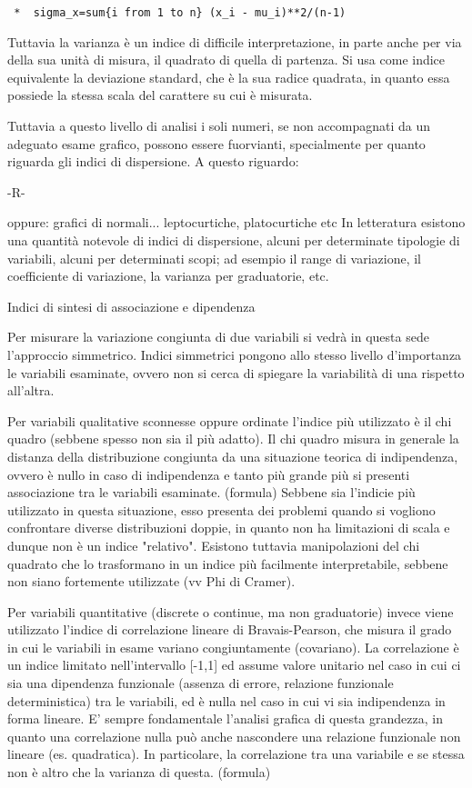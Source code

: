 \documentclass{book}
\begin{document}
\begin{verbatim}
 *	sigma_x=sum{i from 1 to n} (x_i - mu_i)**2/(n-1)
\end{verbatim}

Tuttavia la varianza \`{e} un indice di difficile interpretazione, in parte anche per via della sua unit\`{a} di misura, il quadrato di quella di partenza. Si usa come indice equivalente la deviazione standard, che \`{e} la sua radice quadrata, in quanto essa possiede la stessa scala del carattere su cui \`{e} misurata.

Tuttavia a questo livello di analisi i soli numeri, se non accompagnati da un adeguato esame grafico, possono essere fuorvianti, specialmente per quanto riguarda gli indici di dispersione. A questo riguardo:

	-R-


oppure:
grafici di normali... leptocurtiche, platocurtiche etc
In letteratura esistono una quantit\`{a} notevole di indici di dispersione, alcuni per determinate tipologie di variabili, alcuni per determinati scopi; ad esempio il range di variazione, il coefficiente di variazione, la varianza per graduatorie, etc.

Indici di sintesi di associazione e dipendenza

Per misurare la variazione congiunta di due variabili si vedr\`{a} in questa sede l'approccio simmetrico.
Indici simmetrici pongono allo stesso livello d'importanza le variabili esaminate, ovvero non si cerca di spiegare la variabilit\`{a} di una rispetto all'altra.

Per variabili qualitative sconnesse oppure ordinate l'indice più utilizzato \`{e} il chi quadro (sebbene spesso non sia il più adatto). Il chi quadro misura in generale la distanza della distribuzione congiunta da una situazione teorica di indipendenza, ovvero \`{e} nullo in caso di indipendenza e tanto più grande più si presenti associazione tra le variabili esaminate.
(formula)
Sebbene sia l'indicie più utilizzato in questa situazione, esso presenta dei problemi quando si vogliono confrontare diverse distribuzioni doppie, in quanto non ha limitazioni di scala e dunque non \`{e} un indice "relativo". Esistono tuttavia manipolazioni del chi quadrato che lo trasformano in un indice più facilmente interpretabile, sebbene non siano fortemente utilizzate (vv Phi di Cramer).

Per variabili quantitative (discrete o continue, ma non graduatorie) invece viene utilizzato l'indice di correlazione lineare di Bravais-Pearson, che misura il grado in cui le variabili in esame variano congiuntamente (covariano).
La correlazione \`{e} un indice limitato nell'intervallo [-1,1] ed assume valore unitario nel caso in cui ci sia una dipendenza funzionale (assenza di errore, relazione funzionale deterministica) tra le variabili, ed \`{e} nulla nel caso in cui vi sia indipendenza in forma lineare. E' sempre fondamentale l'analisi grafica di questa grandezza, in quanto una correlazione nulla può anche nascondere una relazione funzionale non lineare (es. quadratica). In particolare, la correlazione tra una variabile e se stessa non \`{e} altro che la varianza di questa.
(formula)
\end{document}
